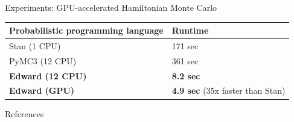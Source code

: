 \documentclass[final]{beamer}
\begin{document}
\begin{frame}[t]
\begin{columns}[t]
\begin{column}{\onecolwid}
\begin{block}{Experiments: GPU-accelerated Hamiltonian Monte Carlo}
\begin{table}[tb]
\centering
\begin{tabular}{ll}
\toprule
Probabilistic programming language & Runtime
\\
\midrule
Stan (1 CPU) \citep{carpenter2016stan} & 171 sec \\
PyMC3 (12 CPU) \citep{salvatier2015probabilistic} & 361 sec \\
\textbf{Edward (12 CPU)} & \textbf{8.2 sec} \\
\textbf{Edward (GPU)} & \textbf{4.9 sec} (35x faster than Stan)\\
\bottomrule
\end{tabular}
\end{table}
\end{block}

\vspace{-2ex}
\begin{block}{References}
\small{
\vspace{0.75in}}
\end{block}

\end{column}

\begin{column}{\sepwid}\end{column} %

\end{columns} %
\end{frame}   %
\end{document}
